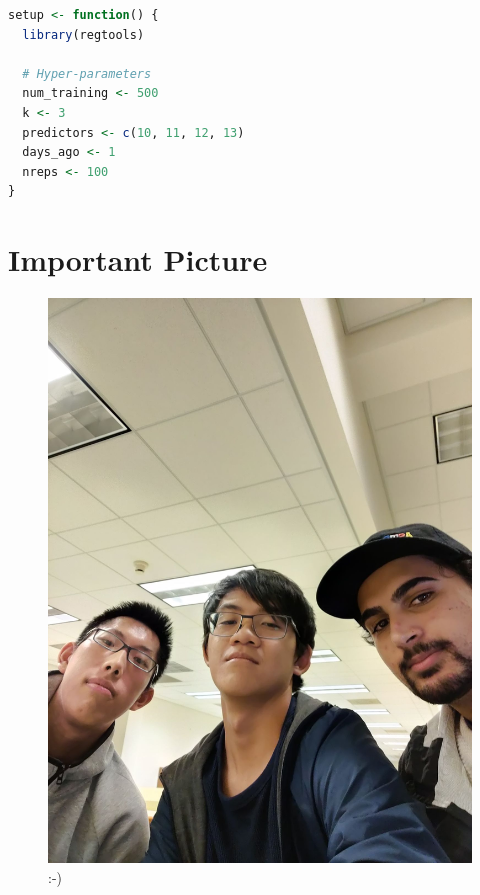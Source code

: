 \documentclass[12pt]{article}
\begin{document}
\begin{lstlisting}[language=R]
setup <- function() {
  library(regtools)
  
  # Hyper-parameters
  num_training <- 500
  k <- 3
  predictors <- c(10, 11, 12, 13)
  days_ago <- 1
  nreps <- 100
}

\end{lstlisting}
\newpage
\section{Important Picture}
\begin{figure}[H]
	\centering
  	\includegraphics[width=0.95\linewidth]{grouppic.jpg}
 	\caption{:-)}
\end{figure}
\end{document}
